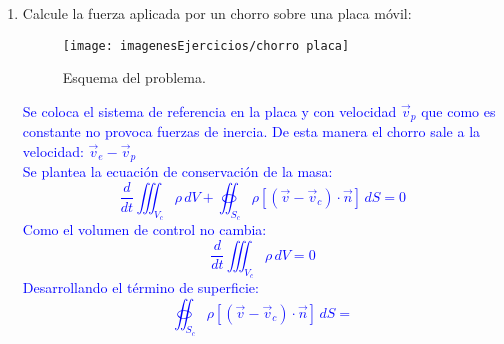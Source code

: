 \begin{enumerate}
 \newpage
\item Calcule la fuerza aplicada por un chorro sobre una placa móvil: 
\begin{figure}[H]
	\centering
	\texttt{[image: imagenesEjercicios/chorro placa]}
	\caption{Esquema del problema.}
	\label{fig:depositobloqueado}
\end{figure}
\textcolor{blue}
{
	Se coloca el sistema de referencia en la placa y con velocidad $\vec{v}_p$ que como es constante no provoca fuerzas de inercia. De esta manera el chorro sale a la velocidad: $\vec{v}_e-\vec{v}_p$
	\\
	Se plantea la ecuación de conservación de la masa: 
	\[\dfrac{d}{dt}\iiint_{V_c}\rho\,dV+\oiint_{S_c} \rho\left[(\vec{v}-\vec{v}_c)\cdot\vec{n}\right] \,dS=0\]
	Como el volumen de control no cambia:
	\[\dfrac{d}{dt}\iiint_{V_c}\rho\,dV=0\]
	Desarrollando el término de superficie:
	\[\oiint_{S_c} \rho\left[(\vec{v}-\vec{v}_c)\cdot\vec{n}\right] \,dS=\]
}
\end{enumerate}
